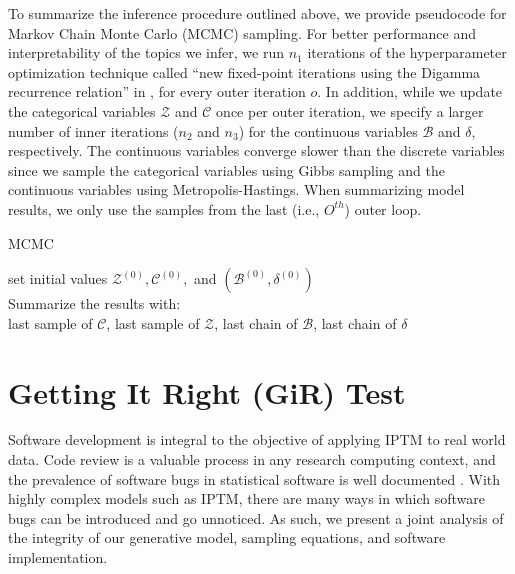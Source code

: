 \documentclass[a4paper]{article}
\begin{document}
 To summarize the inference procedure outlined above, we provide pseudocode for Markov Chain Monte Carlo (MCMC) sampling. For better performance and interpretability of the topics we infer, we run $n_1$ iterations of the hyperparameter optimization technique called ``new fixed-point iterations using the Digamma recurrence relation'' in \cite{wallach2008structured}, for every outer iteration $o$. In addition, while we update the categorical variables $\mathcal{Z}$ and $\mathcal{C}$ once per outer iteration, we specify a larger number of inner iterations ($n_2$ and $n_3$) for the continuous variables $\mathcal{B}$ and $\delta$, respectively. The continuous variables converge slower than the discrete variables since we sample the categorical variables using Gibbs sampling and the continuous variables using Metropolis-Hastings. When summarizing model results, we only use the samples from the last (i.e., $O^{th}$) outer loop.
 \begin{algorithm}[H]
 	\SetAlgoLined
 	\caption{MCMC}
 	set initial values $\mathcal{Z}^{(0)}, \mathcal{C}^{(0)}, $ and $(\mathcal{B}^{(0)}, \delta^{(0)})$\\
 		Summarize the results with:\\
 	last sample of $\mathcal{C}$, last sample of $\mathcal{Z}$, last chain of $\mathcal{B}$, last chain of $\delta$ 
 \end{algorithm}
 
   \section{Getting It Right (GiR) Test}
   Software development is integral to the objective of applying IPTM to real world data. Code review is a valuable process in any research computing context, and the prevalence of software bugs in statistical software is well documented \citep[e.g., ][]{altman2004numerical,mccullough2009accuracy}.  With highly complex models such as IPTM, there are many ways in which software bugs can be introduced and go unnoticed. As such, we present a joint analysis of the integrity of our generative model, sampling equations, and software implementation. 
 
\end{document}
